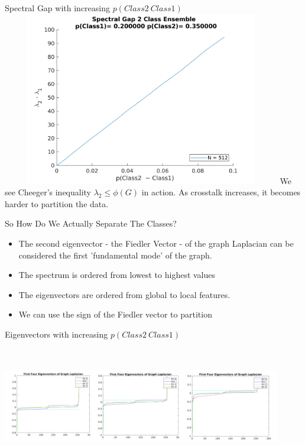 \documentclass{beamer}
\begin{document}
\begin{frame}{Spectral Gap with increasing $p(Class2  ~ Class1)$ }
\includegraphics[width=4.8in,height=3.0in]{images/SpectralGap_P1_0.200000P2_0.350000.jpg}
We see Cheeger's inequality  $\lambda_2 \leq \phi(G)$ in action. As crosstalk increases, it becomes harder to partition the data. 
\end{frame}

\begin{frame}{So How Do We Actually Separate The Classes?}
\begin{itemize}
    \item The second eigenvector - the Fiedler Vector - of the graph Laplacian can be considered the first 'fundamental mode' of the graph. 
    \item The spectrum is ordered from lowest to highest values
    \item The eigenvectors are ordered from global to local features. 
    \item We can use the sign of the Fiedler vector to partition
\end{itemize}
\end{frame}

\begin{frame}{Eigenvectors with increasing $p(Class2  ~ Class1)$ }
\includegraphics[width=4.8in,height=2.3in]{images/ev4.png}
\end{frame}
\end{document}
